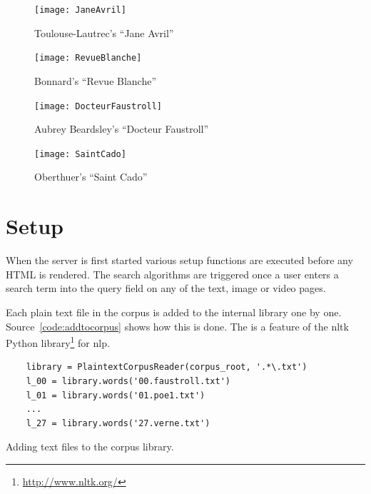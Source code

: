 \begin{figure}
\centering
\begin{minipage}{.45\linewidth}
  \texttt{[image: JaneAvril]}
  \caption[Toulouse-Lautrec's ``Jane Avril'']{Toulouse-Lautrec's ``Jane Avril''}
\label{fig:toulouse}
\end{minipage}
\hspace{.05\linewidth}
\begin{minipage}{.45\linewidth}
  \texttt{[image: RevueBlanche]}
  \caption[Bonnard's ``Revue Blanche'']{Bonnard's ``Revue Blanche''}
\label{fig:bonnard}
\end{minipage}
\vspace{.05\linewidth}
\begin{minipage}{.45\linewidth}
  \texttt{[image: DocteurFaustroll]}
  \caption[Aubrey Beardsley's ``Docteur Faustroll'']{Aubrey Beardsley's ``Docteur Faustroll''}
\label{fig:beardsley}
\end{minipage}
\hspace{.05\linewidth}
\begin{minipage}{.45\linewidth}
  \texttt{[image: SaintCado]}
  \caption[Oberthuer's ``Saint Cado'']{Oberthuer's ``Saint Cado''}
\label{fig:oberthuer}
\end{minipage}
\end{figure}


\section{Setup}

When the server is first started various setup functions are executed before any HTML is rendered. The search algorithms are triggered once a user enters a search term into the query field on any of the text, image or video pages.

Each plain text file in the corpus is added to the internal library one by one. Source~\ref{code:addtocorpus} shows how this is done. The  is a feature of the \gls{nltk} Python library\footnote{\url{http://www.nltk.org/}} for \acrlong{nlp}.

\begin{listing}
  \begin{verbatim}
    library = PlaintextCorpusReader(corpus_root, '.*\.txt')
    l_00 = library.words('00.faustroll.txt')
    l_01 = library.words('01.poe1.txt')
    ...
    l_27 = library.words('27.verne.txt')
  \end{verbatim}
\caption{Adding text files to the corpus library.}
\label{code:addtocorpus}
\end{listing}

